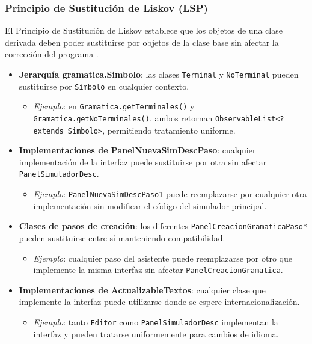 \subsubsection{Principio de Sustitución de Liskov (LSP)}

El Principio de Sustitución de Liskov establece que los objetos de una clase derivada deben poder sustituirse por objetos de la clase base sin afectar la corrección del programa \cite{liskov1994program, martin2003agile}.

\begin{itemize}
    \item \textbf{Jerarquía gramatica.Simbolo}: las clases \texttt{Terminal} y \texttt{NoTerminal} pueden sustituirse por \texttt{Simbolo} en cualquier contexto.
    \begin{itemize}
        \item \textit{Ejemplo}: en \texttt{Gramatica.getTerminales()} y \texttt{Gramatica.getNoTerminales()}, ambos retornan \texttt{ObservableList<? extends Simbolo>}, permitiendo tratamiento uniforme.
    \end{itemize}

    \item \textbf{Implementaciones de PanelNuevaSimDescPaso}: cualquier implementación de la interfaz puede sustituirse por otra sin afectar \texttt{PanelSimuladorDesc}.
    \begin{itemize}
        \item \textit{Ejemplo}: \texttt{PanelNuevaSimDescPaso1} puede reemplazarse por cualquier otra implementación sin modificar el código del simulador principal.
    \end{itemize}

    \item \textbf{Clases de pasos de creación}: los diferentes \texttt{PanelCreacionGramaticaPaso*} pueden sustituirse entre sí manteniendo compatibilidad.
    \begin{itemize}
        \item \textit{Ejemplo}: cualquier paso del asistente puede reemplazarse por otro que implemente la misma interfaz sin afectar \texttt{PanelCreacionGramatica}.
    \end{itemize}

    \item \textbf{Implementaciones de ActualizableTextos}: cualquier clase que implemente la interfaz puede utilizarse donde se espere internacionalización.
    \begin{itemize}
        \item \textit{Ejemplo}: tanto \texttt{Editor} como \texttt{PanelSimuladorDesc} implementan la interfaz y pueden tratarse uniformemente para cambios de idioma.
    \end{itemize}
\end{itemize}

